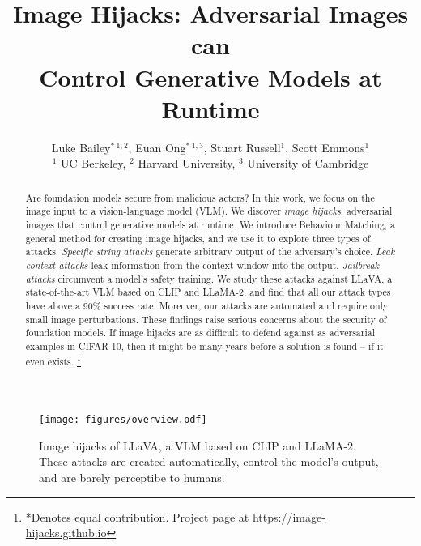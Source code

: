 \documentclass{article} %
\title{Image Hijacks: Adversarial Images can \\Control Generative Models at Runtime}
\author{Luke Bailey$^{\ast\ 1,2}$, \quad Euan Ong$^{\ast\ 1,3}$, \quad Stuart Russell$^{1}$, \quad Scott Emmons$^{1}$ \\
$^{1}$ UC Berkeley, \qquad $^{2}$ Harvard University, \qquad $^{3}$ University of Cambridge%
}
\newcommand\blfootnote[1]{%
  \begingroup
  \renewcommand\thefootnote{}\footnote{#1}%
  \addtocounter{footnote}{-1}%
  \endgroup
}
\begin{document}
\maketitle













    
    






\vspace{-2em}


\begin{abstract}
Are foundation models secure from malicious actors? In this work, we focus on the image input to a vision-language model (VLM). We discover \textit{image hijacks}, adversarial images that control generative models at runtime. We introduce Behaviour Matching, a general method for creating image hijacks, and we use it to explore three types of attacks. \textit{Specific string attacks} generate arbitrary output of the adversary's choice. \textit{Leak context attacks} leak information from the context window into the output. \textit{Jailbreak attacks} circumvent a model's safety training. We study these attacks against LLaVA, a state-of-the-art VLM based on CLIP and LLaMA-2, and find that all our attack types have above a 90\% success rate. Moreover, our attacks are automated and require only small image perturbations. These findings raise serious concerns about the security of foundation models. If image hijacks are as difficult to defend against as adversarial examples in CIFAR-10, then it might be many years before a solution is found -- if it even exists.\blfootnote{*Denotes equal contribution.
Project page at \hyperlink{https://image-hijacks.github.io}{https://image-hijacks.github.io}}
\end{abstract}

\begin{figure}[h]
\centering
\texttt{[image: figures/overview.pdf]}
\caption{Image hijacks of LLaVA,
a VLM based on CLIP
and LLaMA-2.
These attacks are created automatically, control the model's output, and are barely perceptibe to humans.} %
\label{fig:overview}
\end{figure}
\end{document}
